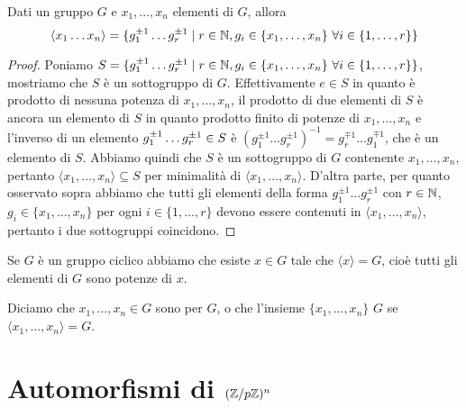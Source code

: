 \documentclass[11pt]{scrartcl}
\begin{document}
\begin{proposition}
Dati un gruppo $G$ e $x_1, \ldots, x_n$ elementi di $G$, allora \[
    \langle x_1 \ldots x_n\rangle = \{g_1^{\pm 1} \ldots g_r^{\pm 1}\mid r 
    \in \mathbb N, g_i \in \{x_1, \ldots, x_n\}~\forall i \in \{1, \ldots, r\}\}
    \]
\end{proposition}

\begin{proof}
Poniamo $S = \{g_1^{\pm 1} \ldots g_r^{\pm 1}\mid r \in \mathbb N, g_i \in \{x_1, \ldots, x_n\}
~\forall i \in \{1, \ldots, r\}\}$, mostriamo che $S$ è un sottogruppo di $G$. 
Effettivamente $e \in S$ in quanto è prodotto di nessuna potenza di $x_1, \ldots, x_n$, 
il prodotto di due elementi di $S$ è ancora un elemento di $S$ in quanto
prodotto finito di potenze di $x_1, \ldots, x_n$ e l'inverso di un elemento
$g_1^{\pm 1}\ldots g_r^{\pm 1} \in\nolinebreak S$ è $(g_1^{\pm 1}\ldots 
g_r^{\pm 1})^{-1} = g_r^{\mp 1}\ldots g_1^{\mp 1}$, che è un elemento di $S$.
Abbiamo quindi che $S$ è un sottogruppo di $G$ contenente $x_1, \ldots, x_n$,
pertanto $\langle x_1, \ldots, x_n\rangle\subseteq S$ per minimalità di $\langle x_1,
\ldots, x_n\rangle$. D'altra parte, per quanto osservato sopra abbiamo che
tutti gli elementi della forma $g_1^{\pm 1}\ldots g_r^{\pm 1}$ con $r \in \mathbb N$, 
$g_i \in \{x_1, \ldots, x_n\}$ per ogni $i \in \{1, \ldots, r\}$ devono essere
contenuti in $\langle x_1, \ldots, x_n\rangle$, pertanto i due sottogruppi
coincidono.
\end{proof}

\begin{remark}
    Se $G$ è un gruppo ciclico abbiamo che esiste $x \in G$ tale che 
    $\langle x\rangle = G$, cioè tutti gli elementi di $G$ sono potenze di $x$.
\end{remark}

Diciamo che $x_1, \ldots, x_n \in G$ sono  per $G$, o che 
l'insieme $\{x_1, \ldots, x_n\}$  $G$ se $\langle x_1, \ldots, x_n\rangle = G$.

\newpage

\section{Automorfismi di $({\mathbb Z}/p{\mathbb Z})^n$}
\label{aut sp vet}
\end{document}
